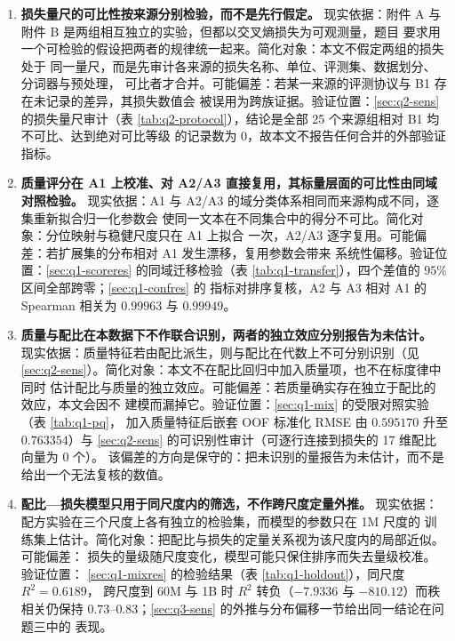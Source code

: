 \documentclass[bwprint]{gmcmthesis}
\numberwithin{equation}{section}
\numberwithin{figure}{section}
\numberwithin{table}{section}
\begin{document}
\begin{enumerate}
\item \textbf{损失量尺的可比性按来源分别检验，而不是先行假定。}
现实依据：附件 A 与附件 B 是两组相互独立的实验，但都以交叉熵损失为可观测量，题目
要求用一个可检验的假设把两者的规律统一起来。简化对象：本文不假定两组的损失处于
同一量尺，而是先审计各来源的损失名称、单位、评测集、数据划分、分词器与预处理，
可比者才合并。可能偏差：若某一来源的评测协议与 B1 存在未记录的差异，其损失数值会
被误用为跨族证据。验证位置：\ref{sec:q2-sens} 的损失量尺审计（表
\ref{tab:q2-protocol}），结论是全部 25 个来源组相对 B1 均不可比、达到绝对可比等级
的记录数为 0，故本文不报告任何合并的外部验证指标。

\item \textbf{质量评分在 A1 上校准、对 A2/A3 直接复用，其标量层面的可比性由同域
      对照检验。}
现实依据：A1 与 A2/A3 的域分类体系相同而来源构成不同，逐集重新拟合归一化参数会
使同一文本在不同集合中的得分不可比。简化对象：分位映射与稳健尺度只在 A1 上拟合
一次，A2/A3 逐字复用。可能偏差：若扩展集的分布相对 A1 发生漂移，复用参数会带来
系统性偏移。验证位置：\ref{sec:q1-scoreres} 的同域迁移检验（表
\ref{tab:q1-transfer}），四个差值的 $95\%$ 区间全部跨零；\ref{sec:q1-confres} 的
指标对排序复核，A2 与 A3 相对 A1 的 Spearman 相关为 $0.99963$ 与 $0.99949$。

\item \textbf{质量与配比在本数据下不作联合识别，两者的独立效应分别报告为未估计。}
现实依据：质量特征若由配比派生，则与配比在代数上不可分别识别（见
\ref{sec:q2-sens}）。简化对象：本文不在配比回归中加入质量项，也不在标度律中同时
估计配比与质量的独立效应。可能偏差：若质量确实存在独立于配比的效应，本文会因不
建模而漏掉它。验证位置：\ref{sec:q1-mix} 的受限对照实验（表 \ref{tab:q1-pq}，
加入质量特征后嵌套 OOF 标准化 RMSE 由 $0.595170$ 升至 $0.763354$）与
\ref{sec:q2-sens} 的可识别性审计（可逐行连接到损失的 17 维配比向量为 0 个）。
该偏差的方向是保守的：把未识别的量报告为未估计，而不是给出一个无法复核的数值。

\item \textbf{配比—损失模型只用于同尺度内的筛选，不作跨尺度定量外推。}
现实依据：配方实验在三个尺度上各有独立的检验集，而模型的参数只在 1M 尺度的
训练集上估计。简化对象：把配比与损失的定量关系视为该尺度内的局部近似。可能偏差：
损失的量级随尺度变化，模型可能只保住排序而失去量级校准。验证位置：
\ref{sec:q1-mixres} 的检验结果（表 \ref{tab:q1-holdout}），同尺度 $R^2=0.6189$，
跨尺度到 60M 与 1B 时 $R^2$ 转负（$-7.9336$ 与 $-810.12$）而秩相关仍保持
$0.73$--$0.83$；\ref{sec:q3-sens} 的外推与分布偏移一节给出同一结论在问题三中的
表现。
\end{enumerate}
\end{document}
